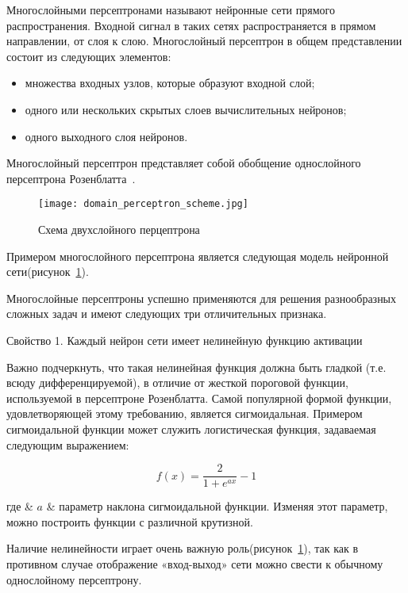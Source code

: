 Многослойными персептронами называют нейронные сети прямого распространения.
Входной сигнал в таких сетях распространяется в прямом направлении, от слоя к слою.
Многослойный персептрон в общем представлении состоит из следующих элементов:

\begin{itemize}
  \item множества входных узлов, которые образуют входной слой;
  \item одного или нескольких скрытых слоев вычислительных нейронов;
  \item одного выходного слоя нейронов.
\end{itemize}

Многослойный персептрон представляет собой обобщение однослойного персептрона Розенблатта~\cite{domain_rosenblatt}.

\begin{figure}[ht]
\centering
  \texttt{[image: domain\_perceptron\_scheme.jpg]}
  \caption{ Схема двухслойного перцептрона }
  \label{fig:perceptron_scheme}
\end{figure}

Примером многослойного персептрона является следующая модель нейронной сети(рисунок~\ref{fig:perceptron_scheme}).

Многослойные персептроны успешно применяются для решения разнообразных сложных задач и имеют следующих три отличительных признака.

Свойство 1. Каждый нейрон сети имеет нелинейную функцию активации

Важно подчеркнуть, что такая нелинейная функция должна быть гладкой (т.е. всюду дифференцируемой), в отличие от жесткой пороговой функции, используемой в персептроне Розенблатта.
Самой популярной формой функции, удовлетворяющей этому требованию, является сигмоидальная. Примером сигмоидальной функции может служить логистическая функция, задаваемая следующим выражением:

\begin{equation}
  \label{eq:domain:activation_function}
  f(x)=\frac{2}{1+e^{ax}}-1
\end{equation}
\begin{explanation}
  где & $ a $ & параметр наклона сигмоидальной функции. Изменяя этот параметр, можно построить функции с различной крутизной.
\end{explanation}

Наличие нелинейности играет очень важную роль(рисунок~\ref{fig:perceptron_scheme}), так как в противном случае отображение «вход-выход» сети можно свести к обычному однослойному персептрону.

